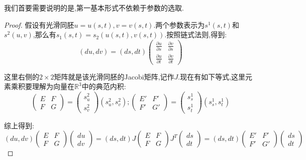 我们首要需要说明的是,第一基本形式不依赖于参数的选取.
\begin{proof}

假设有光滑同胚$u=u(s,t),v=v(s,t)$.两个参数表示为$s^1(s,t)$和$s^2(u,v)$,那么有$s_1(s,t)=s_2(u(s,t),v(s,t))$.按照链式法则,得到:
$$\left(du,dv\right)=(ds,dt)\left(\begin{array}{cc} \frac{\partial u}{\partial s}&\frac{\partial v}{\partial s}\\\frac{\partial u}{\partial t}&\frac{\partial v}{\partial t}\end{array}\right)$$

这里右侧的$2\times2$矩阵就是该光滑同胚的Jacobi矩阵,记作$J$.现在有如下等式,这里元素乘积要理解为向量在$\mathbb{R}^3$中的典范内积:
$$\left(\begin{array}{cc} E&F\\ F&G\end{array}\right)=\left(\begin{array}{c} s^2_u\\s^2_v\end{array}\right)(s^2_u,s^2_v);\left(\begin{array}{cc} E'&F'\\ F'&G'\end{array}\right)=\left(\begin{array}{c} s^1_s\\s^1_t\end{array}\right)(s^1_s,s^1_t)$$

综上得到:
$$(du,dv)\left(\begin{array}{cc} E&F\\ F&G\end{array}\right)\left(\begin{array}{c} du\\dv\end{array}\right)=(ds,dt)J\left(\begin{array}{cc} E&F\\ F&G\end{array}\right)J^T\left(\begin{array}{c}ds\\dt\end{array}\right)=(ds,dt)\left(\begin{array}{cc} E'&F'\\ F'&G'\end{array}\right)\left(\begin{array}{c}ds\\dt\end{array}\right)$$
\end{proof}

